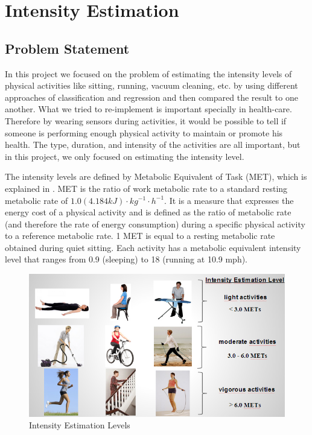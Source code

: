 \documentclass[12pt, a4paper, onecolumn, oneside, parskip=half]{scrartcl}
\begin{document}
\section{Intensity Estimation}

\subsection{Problem Statement}

In this project we focused on the problem of estimating the intensity levels of physical activities like sitting, running, vacuum cleaning, etc. by using different approaches of classification and regression and then compared the result to one another. What we tried to re-implement is important specially in health-care. Therefore by wearing sensors during activities, it would be possible to tell if someone is performing enough physical activity to maintain or promote his health. The type, duration, and intensity of the activities are all important, but in this project, we only focused on estimating the intensity level.

The intensity levels are defined by Metabolic Equivalent of Task (MET), which is explained in \cite{met_paper}. MET is the ratio of work metabolic rate to a standard resting metabolic rate of $1.0 (4.184  kJ)\cdot kg^{-1}\cdot h^{-1}$. It is a measure that expresses the energy cost of a physical activity and is defined as the ratio of metabolic rate (and therefore the rate of energy consumption) during a specific physical activity to a reference metabolic rate. 1 MET is equal to a resting metabolic rate obtained during quiet sitting. Each activity has a metabolic equivalent intensity level that ranges from 0.9 (sleeping) to 18 (running at 10.9 mph). 

\begin{figure}[ht!]
  \centering
  \includegraphics[width=160mm]{pictures/nine_activities.png}
  \caption{Intensity Estimation Levels
  \label{intensity_levels}}
\end{figure}
\end{document}
